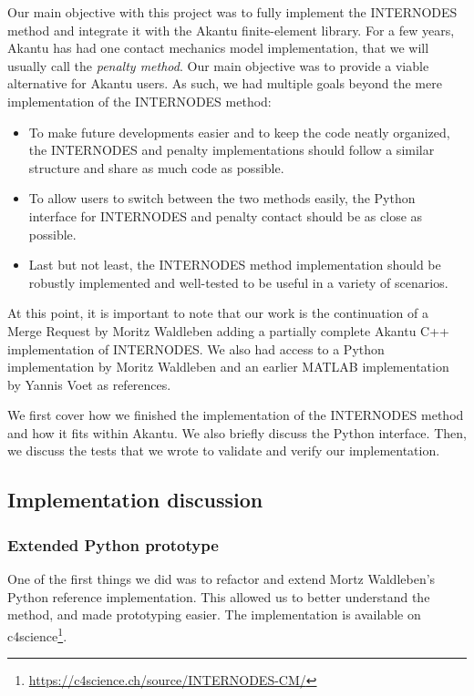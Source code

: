 \documentclass[11pt, a4paper]{article}
\begin{document}
Our main objective with this project was to fully implement the INTERNODES method and integrate it with the Akantu finite-element library. For a few years, Akantu has had one contact mechanics model implementation, that we will usually call the \textit{penalty method}. Our main objective was to provide a viable alternative for Akantu users. As such, we had multiple goals beyond the mere implementation of the INTERNODES method:
\begin{itemize}
    \item To make future developments easier and to keep the code neatly organized, the INTERNODES and penalty implementations should follow a similar structure and share as much code as possible.
    \item To allow users to switch between the two methods easily, the Python interface for INTERNODES and penalty contact should be as close as possible.
    \item Last but not least, the INTERNODES method implementation should be robustly implemented and well-tested to be useful in a variety of scenarios.
\end{itemize}

At this point, it is important to note that our work is the continuation of a Merge Request by Moritz Waldleben \cite{moritz} adding a partially complete Akantu C++ implementation of INTERNODES. We also had access to a Python implementation by Moritz Waldleben and an earlier MATLAB implementation by Yannis Voet \cite{voet} as references.

We first cover how we finished the implementation of the INTERNODES method and how it fits within Akantu. We also briefly discuss the Python interface. Then, we discuss the tests that we wrote to validate and verify our implementation.

\subsection{Implementation discussion}

\subsubsection{Extended Python prototype}
One of the first things we did was to refactor and extend Mortz Waldleben's Python reference implementation. This allowed us to better understand the method, and made prototyping easier. The implementation is available on c4science\footnote{\url{https://c4science.ch/source/INTERNODES-CM/}}.
\end{document}
